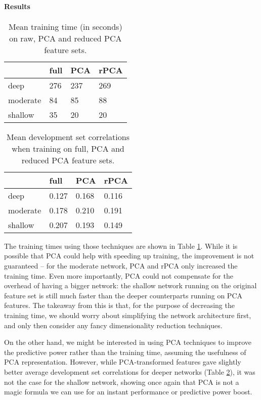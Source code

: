\documentclass[10pt, twocolumn]{article}
\begin{document}

\paragraph{Results} 
\begin{table}[]
	\begin{tabularx}{\linewidth}{XXXX}
		\hline
				& \textbf{full} & \textbf{PCA} & \textbf{rPCA}\\ \hline
		deep    & 276   & 237  & 269 \\
		moderate  & 84 & 85 & 88 \\
		shallow & 35 & 20 & 20
		\end{tabularx}
\caption{Mean training time (in seconds) on raw, PCA and reduced PCA feature sets.}\label{g2}
\end{table}

\begin{table}[]
	\begin{tabularx}{\linewidth}{XXXX}
		\hline
				& \textbf{full} & \textbf{PCA} & \textbf{rPCA}\\ \hline
		deep    & 0.127   & 0.168  & 0.116 \\
		moderate  & 0.178 & 0.210 & 0.191 \\
		shallow & 0.207 & 0.193 & 0.149
		\end{tabularx}
\caption{Mean development set correlations when training on full, PCA and reduced PCA feature sets.}\label{g3}
\end{table}

The training times using those techniques are shown in Table \ref{g2}. While it is possible that PCA could help with speeding up training, the improvement is not guaranteed – for the moderate network, PCA and rPCA only increased the training time. Even more importantly, PCA could not compensate for the overhead of having a bigger network: the shallow network running on the original feature set is still much faster than the deeper counterparts running on PCA features. The takeaway from this is that, for the purpose of decreasing the training time, we should worry about simplifying the network architecture first, and only then consider any fancy dimensionality reduction techniques.

On the other hand, we might be interested in using PCA techniques to improve the predictive power rather than the training time, assuming the usefulness of PCA representation. However, while PCA-transformed features gave slightly better average development set correlations for deeper networks (Table \ref{g3}), it was not the case for the shallow network, showing once again that PCA is not a magic formula we can use for an instant performance or predictive power boost.
\end{document}
